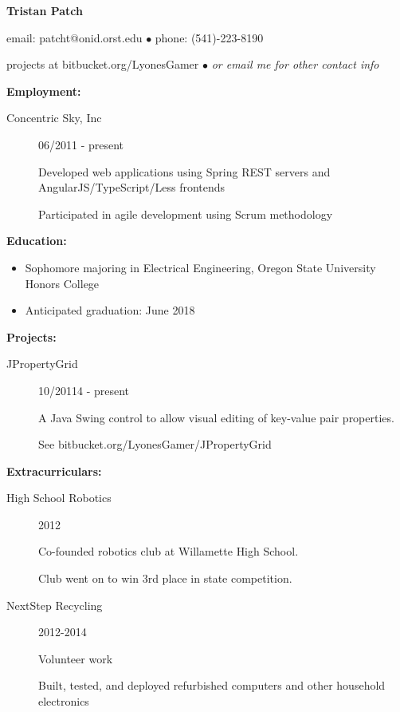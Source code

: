 \documentclass[11pt]{article}
\begin{document}
\centerline{{\LARGE \bf Tristan Patch}}
\bigskip
\centerline{email: patcht@onid.orst.edu
$\bullet$
phone: (541)-223-8190}
\centerline{projects at bitbucket.org/LyonesGamer
$\bullet$
\emph{or email me for other contact info}}
\bigskip
\hrulefill
\bigskip
{\Large \bf Employment:}
\begin{description}
\item[Concentric Sky, Inc]
\hfill 06/2011 - present

Developed web applications using Spring REST servers and AngularJS/TypeScript/Less frontends

Participated in agile development using Scrum methodology
\end{description}
\smallskip
\hrulefill
\bigskip
{\Large \bf Education:}
\begin{itemize}
\setlength{\itemsep}{1pt}
\setlength{\parskip}{0pt}
\setlength{\parsep}{0pt}
\item Sophomore majoring in Electrical Engineering, Oregon State University
Honors College
\item Anticipated graduation: June 2018
\end{itemize}
\smallskip
\hrulefill
\bigskip
{\Large \bf Projects:}
\begin{description}
\item[JPropertyGrid]
\hfill 10/20114 - present

A Java Swing control to allow visual editing of key-value pair properties.

See bitbucket.org/LyonesGamer/JPropertyGrid
\end{description}
\smallskip
\hrulefill
\bigskip
{\Large \bf Extracurriculars:}
\begin{description}
\item[High School Robotics]
\hfill 2012

Co-founded robotics club at Willamette High School.

Club went on to win 3rd place in state competition.

\item[NextStep Recycling]
\hfill 2012-2014

Volunteer work

Built, tested, and deployed refurbished computers and other household electronics
\end{description}
\end{document}
